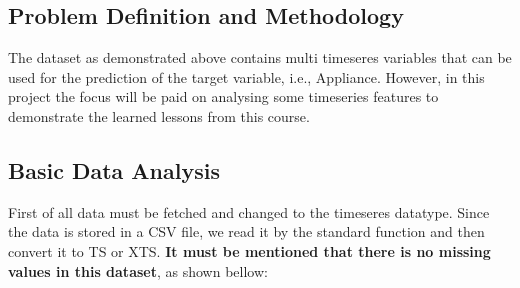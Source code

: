 \documentclass[]{article}
\begin{document}
\subsection{Problem Definition and
Methodology}\label{problem-definition-and-methodology}

The dataset as demonstrated above contains multi timeseres variables
that can be used for the prediction of the target variable, i.e.,
Appliance. However, in this project the focus will be paid on analysing
some timeseries features to demonstrate the learned lessons from this
course.

\subsection{Basic Data Analysis}\label{basic-data-analysis}

First of all data must be fetched and changed to the timeseres datatype.
Since the data is stored in a CSV file, we read it by the standard
function and then convert it to TS or XTS. \textbf{It must be mentioned
that there is no missing values in this dataset}, as shown bellow:
\end{document}
